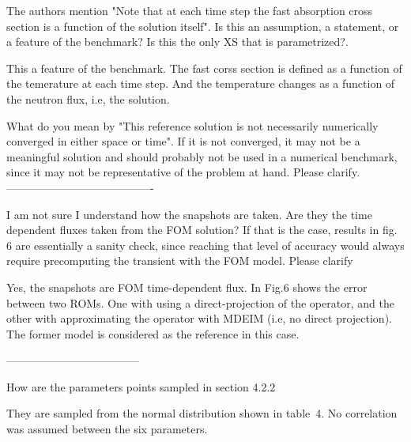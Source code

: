 \documentclass[10pt]{article}
\begin{document}
\begin{response}{The authors mention "Note that at each time step the fast absorption cross section is a function of the solution itself". Is this an assumption, a statement, or a feature of the benchmark? Is this the only XS that is parametrized?.}
		
This a feature of the benchmark. The fast corss section is defined as a function of the temerature at each time step. And the temperature changes as a function of the neutron flux, i.e, the solution.
\end{response}

\begin{response}
  {What do you mean by "This reference solution is not necessarily numerically converged in either space or time". If it is not converged, it may not be a meaningful solution and should probably not be used in a numerical benchmark, since it may not be representative of the problem at hand. Please clarify.}
  ----------------------------------------
	
\end{response}

\begin{response}
	{ I am not sure I understand how the snapshots are taken. Are they the time dependent fluxes taken from the FOM solution? If that is the case, results in fig. 6 are essentially a sanity check, since reaching that level of accuracy would always require precomputing the transient with the FOM model. Please clarify}
	
	Yes, the snapshots are FOM time-dependent flux. In Fig.6 shows the error between two ROMs.
	One with using a direct-projection of the operator, and the other with approximating the operator with MDEIM (i.e, no direct projection). The former model is considered as the reference in this case.
	
	
	
------------------------------------
\end{response}

\begin{response}
 {How are the parameters points sampled in section 4.2.2}
 
 They are sampled from the normal distribution shown in table~4. No correlation was assumed between the six parameters.

\end{response}
\end{document}
